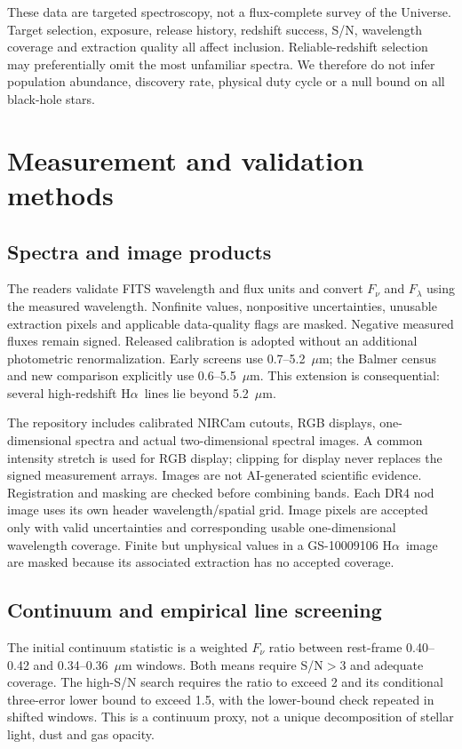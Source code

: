 \documentclass[11pt,a4paper]{article}
\newcommand{\ha}{H$\alpha$}
\begin{document}
These data are targeted spectroscopy, not a flux-complete survey of the Universe. Target selection, exposure, release history, redshift success, S/N, wavelength coverage and extraction quality all affect inclusion. Reliable-redshift selection may preferentially omit the most unfamiliar spectra. We therefore do not infer population abundance, discovery rate, physical duty cycle or a null bound on all black-hole stars.

\section{Measurement and validation methods}
\subsection{Spectra and image products}
The readers validate FITS wavelength and flux units and convert $F_\nu$ and $F_\lambda$ using the measured wavelength. Nonfinite values, nonpositive uncertainties, unusable extraction pixels and applicable data-quality flags are masked. Negative measured fluxes remain signed. Released calibration is adopted without an additional photometric renormalization. Early screens use 0.7--5.2~$\mu$m; the Balmer census and new comparison explicitly use 0.6--5.5~$\mu$m. This extension is consequential: several high-redshift \ha\ lines lie beyond 5.2~$\mu$m.

The repository includes calibrated NIRCam cutouts, RGB displays, one-dimensional spectra and actual two-dimensional spectral images. A common intensity stretch is used for RGB display; clipping for display never replaces the signed measurement arrays. Images are not AI-generated scientific evidence. Registration and masking are checked before combining bands. Each DR4 nod image uses its own header wavelength/spatial grid. Image pixels are accepted only with valid uncertainties and corresponding usable one-dimensional wavelength coverage. Finite but unphysical values in a GS-10009106 \ha\ image are masked because its associated extraction has no accepted coverage.

\subsection{Continuum and empirical line screening}
The initial continuum statistic is a weighted $F_\nu$ ratio between rest-frame 0.40--0.42 and 0.34--0.36~$\mu$m windows. Both means require S/N$>3$ and adequate coverage. The high-S/N search requires the ratio to exceed 2 and its conditional three-error lower bound to exceed 1.5, with the lower-bound check repeated in shifted windows. This is a continuum proxy, not a unique decomposition of stellar light, dust and gas opacity.
\end{document}
